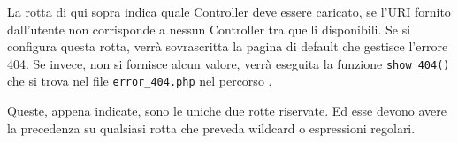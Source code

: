 
La rotta di qui sopra indica quale Controller deve essere caricato, se l'\ac{URI} fornito dall'utente non corrisponde a nessun Controller tra quelli disponibili. Se si configura questa rotta, verrà sovrascritta la pagina di default che gestisce l'errore 404. Se invece, non si fornisce alcun valore, verrà eseguita la funzione \verb|show_404()| che si trova nel file \verb|error_404.php| nel percorso .

Queste, appena indicate, sono le uniche due rotte riservate. Ed esse devono avere la precedenza su qualsiasi rotta che preveda wildcard o espressioni regolari.